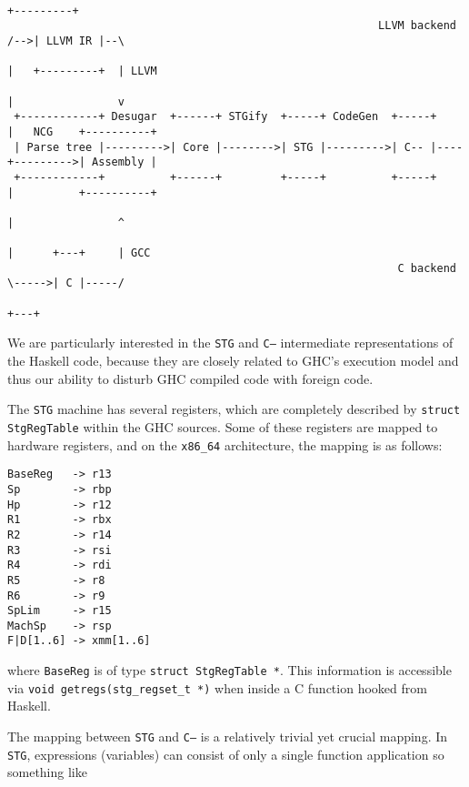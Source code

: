 \documentclass[letterpaper]{article}
\begin{document}
\begin{listing}[H]
\begin{verbatim}
                                                                          +---------+
                                                         LLVM backend /-->| LLVM IR |--\
                                                                      |   +---------+  | LLVM
                                                                      |                v
 +------------+ Desugar  +------+ STGify  +-----+ CodeGen  +-----+    |   NCG    +----------+
 | Parse tree |--------->| Core |-------->| STG |--------->| C-- |----+--------->| Assembly |
 +------------+          +------+         +-----+          +-----+    |          +----------+
                                                                      |                ^
                                                                      |      +---+     | GCC
                                                            C backend \----->| C |-----/
                                                                             +---+
\end{verbatim}
\end{listing}

We are particularly interested in the \texttt{STG} and \texttt{C--} intermediate
representations of the Haskell code, because they are closely related to GHC's
execution model and thus our ability to disturb GHC compiled code with foreign
code.

The \texttt{STG} machine has several registers, which are completely described
by \texttt{struct StgRegTable} within the GHC sources. Some of these
registers are mapped to hardware registers, and on the \texttt{x86\_64}
architecture, the mapping is as follows:

\begin{verbatim}
BaseReg   -> r13
Sp        -> rbp
Hp        -> r12
R1        -> rbx
R2        -> r14
R3        -> rsi
R4        -> rdi
R5        -> r8
R6        -> r9
SpLim     -> r15
MachSp    -> rsp
F|D[1..6] -> xmm[1..6]
\end{verbatim}

where \texttt{BaseReg} is of type \texttt{struct StgRegTable
*}. This information is accessible via \texttt{void getregs(stg_regset_t
*)} when inside a C function hooked from Haskell.

The mapping between \texttt{STG} and \texttt{C--} is a relatively trivial yet
crucial mapping. In \texttt{STG}, expressions (variables) can consist of only a
single function application so something like
\end{document}
